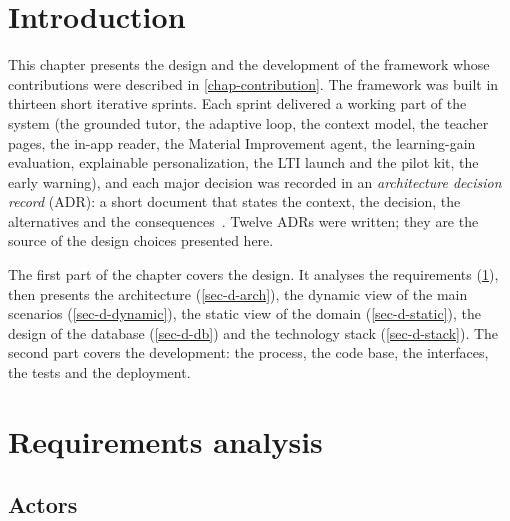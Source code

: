 
\section*{Introduction}
\label{sec-d-intro}

This chapter presents the design and the development of the framework
whose contributions were described in \cref{chap-contribution}. The
framework was built in thirteen short iterative sprints. Each sprint
delivered a working part of the system (the grounded tutor, the adaptive
loop, the context model, the teacher pages, the in-app reader, the
Material Improvement agent, the learning-gain evaluation, explainable
personalization, the LTI launch and the pilot kit, the early warning), and
each major decision was recorded in an \emph{architecture decision record}
(ADR): a short document that states the context, the decision, the
alternatives and the consequences~\cite{nygard2011adr}. Twelve ADRs were
written; they are the source of the design choices presented here.

The first part of the chapter covers the design. It analyses the
requirements (\cref{sec-d-req}), then presents the architecture
(\cref{sec-d-arch}), the dynamic view of the main scenarios
(\cref{sec-d-dynamic}), the static view of the domain
(\cref{sec-d-static}), the design of the database (\cref{sec-d-db}) and
the technology stack (\cref{sec-d-stack}). The second part covers the
development: the process, the code base, the interfaces, the tests and
the deployment.

\section{Requirements analysis}
\label{sec-d-req}

\subsection{Actors}

